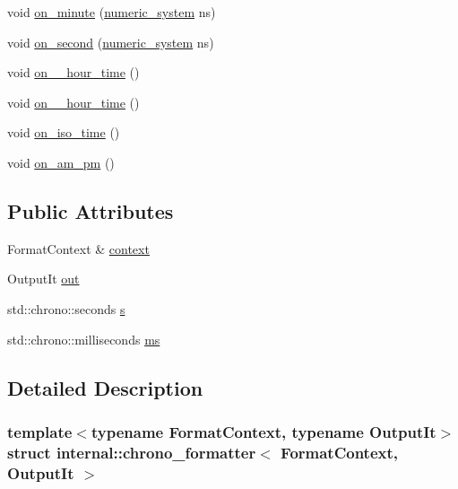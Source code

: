 \begin{DoxyCompactItemize}
\item 
void \hyperlink{structinternal_1_1chrono__formatter_a3c876205400e32b34a88986f47b0775d}{on\+\_\+minute} (\hyperlink{namespaceinternal_a16e2a1195ca0f5beab658685f71df86b}{numeric\+\_\+system} ns)
\item 
void \hyperlink{structinternal_1_1chrono__formatter_a569d41b43bfdf48aca8ff9429f57dea3}{on\+\_\+second} (\hyperlink{namespaceinternal_a16e2a1195ca0f5beab658685f71df86b}{numeric\+\_\+system} ns)
\item 
void \hyperlink{structinternal_1_1chrono__formatter_a6e42531597b2137916865a2a4ebb557e}{on\+\_\+\_\+hour\+\_\+time} ()
\item 
void \hyperlink{structinternal_1_1chrono__formatter_a5c9271dd72f0802191c6adfaeae8a1dc}{on\+\_\+\_\+hour\+\_\+time} ()
\item 
void \hyperlink{structinternal_1_1chrono__formatter_a578e890af81d7ea6c4c3dcb64ba2e8e2}{on\+\_\+iso\+\_\+time} ()
\item 
void \hyperlink{structinternal_1_1chrono__formatter_a4491be3f9b0474c5eeb29f95ed5fa426}{on\+\_\+am\+\_\+pm} ()
\end{DoxyCompactItemize}
\subsection*{Public Attributes}
\begin{DoxyCompactItemize}
\item 
Format\+Context \& \hyperlink{structinternal_1_1chrono__formatter_a4ef7274fcb1343272c95c0e8506fa255}{context}
\item 
Output\+It \hyperlink{structinternal_1_1chrono__formatter_a9e01b4a83c26f7a26fbd3b2a66613b60}{out}
\item 
std\+::chrono\+::seconds \hyperlink{structinternal_1_1chrono__formatter_af017aee86082dedb1be9218d369213ee}{s}
\item 
std\+::chrono\+::milliseconds \hyperlink{structinternal_1_1chrono__formatter_a4bb1878dfded9876eb133b8c19b0e28c}{ms}
\end{DoxyCompactItemize}


\subsection{Detailed Description}
\subsubsection*{template$<$typename Format\+Context, typename Output\+It$>$\newline
struct internal\+::chrono\+\_\+formatter$<$ Format\+Context, Output\+It $>$}



